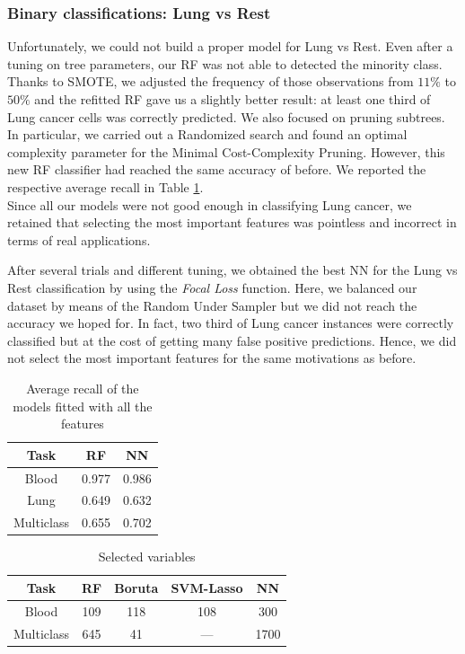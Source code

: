 \documentclass[a4paper,11pt, oneside]{article}  %
\begin{document}
\subsubsection{Binary classifications: Lung vs Rest}
Unfortunately, we could not build a proper model for Lung vs Rest. Even after a tuning on tree parameters, our RF was not able to detected the minority class. Thanks to SMOTE, we adjusted the frequency of those observations from $11\%$ to $50\%$ and the refitted RF gave us a slightly better result: at least one third of Lung cancer cells was correctly predicted. We also focused on pruning subtrees. In particular, we carried out a Randomized search and found an optimal complexity parameter for the Minimal Cost-Complexity Pruning. However, this new RF classifier had reached the same accuracy of before. We reported the respective average recall in Table \ref{table:big_models}. \\
Since all our models were not good enough in classifying Lung cancer, we retained that selecting the most important features was pointless and incorrect in terms of real applications. 

After several trials and different tuning, we obtained the best NN for the Lung vs Rest classification by using the \textit{Focal Loss} function. Here, we balanced our dataset by means of the Random Under Sampler but we did not reach the accuracy we hoped for. In fact, two third of Lung cancer instances were correctly classified but at the cost of getting many false positive predictions. Hence, we did not select the most important features for the same motivations as before. 







\begin{table}[h!]
	\caption{Average recall of the models fitted with all the features}
	\centering
	\begin{tabular}{c c c}
		\hline\hline
		Task & RF & NN \\ [0.5ex] %
		\hline
		Blood & 0.977  & 0.986 \\
		Lung & 0.649  & 0.632 \\
		Multiclass & 0.655 & 0.702 \\ [1ex]
		\hline
	\end{tabular}
	\label{table:big_models}
\end{table}

\begin{table}[h!]
	\caption{Selected variables}
	\centering
	\begin{tabular}{c c c c c}
		\hline\hline
		Task & RF & Boruta & SVM-Lasso & NN \\ [0.5ex] %
		\hline
		Blood & 109 & 118 & 108 & 300 \\
		Multiclass & 645 &  41 & --- & 1700 \\ [1ex]
		\hline
	\end{tabular}
	\label{table:selected variables}
\end{table}
\end{document}
